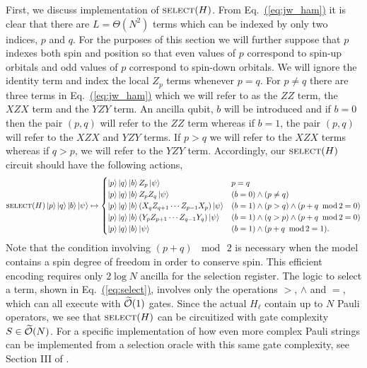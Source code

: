 \documentclass[superscriptaddress,aps,pra,nofootinbib,notitlepage,10pt,longbibliography]{revtex4-1}
\newcommand{\eq}[1]{Eq.~\hyperref[eq:#1]{(\ref*{eq:#1})}}
\def\ket#1{\mathinner{|{#1}\rangle}}
\begin{document}
First, we discuss implementation of $\textsc{select}(H)$. From \eq{jw_ham} it is clear that there are $L = \Theta(N^2)$ terms which can be indexed by only two indices, $p$ and $q$. For the purposes of this section we will further suppose that $p$ indexes both spin and position so that even values of $p$ correspond to spin-up orbitals and odd values of $p$ correspond to spin-down orbitals. We will ignore the identity term and index the local $Z_p$ terms whenever $p = q$. For $p \neq q$ there are three terms in \eq{jw_ham} which we will refer to as the $ZZ$ term, the $XZX$ term and the $YZY$ term. An ancilla qubit, $b$ will be introduced and if $b = 0$ then the pair $(p, q)$ will refer to the $ZZ$ term whereas if $b = 1$, the pair $(p, q)$ will refer to the $XZX$ and $YZY$ terms. If $p > q$ we will refer to the $XZX$ terms whereas if $q > p$, we will refer to the $YZY$ term. Accordingly, our $\textsc{select}(H)$ circuit should have the following actions,
\begin{equation}
\label{eq:select}
\textsc{select}(H) \ket{p} \ket{q} \ket{b} \ket{\psi} \mapsto \begin{cases}
\ket{p} \ket{q} \ket{b} Z_p \ket{\psi} & p = q \\
\ket{p} \ket{q} \ket{b} Z_p Z_q \ket{\psi} & (b = 0) \wedge (p \neq q) \\
\ket{p} \ket{q} \ket{b} (X_q Z_{q + 1} \cdots Z_{p - 1} X_p) \ket{\psi} & (b = 1) \wedge (p > q) \wedge (p + q \, \!\!\mod\!\! \, 2 = 0 )\\
\ket{p} \ket{q} \ket{b} (Y_p Z_{p + 1} \cdots Z_{q - 1} Y_q) \ket{\psi} & (b = 1) \wedge (q > p) \wedge (p + q \, \!\!\mod\!\! \, 2 = 0)\\
\ket{p} \ket{q} \ket{b} \ket{\psi} & (b = 1) \wedge (p + q \, \!\!\mod\!\! \, 2 = 1).
\end{cases}
\end{equation}
Note that the condition involving $(p + q) \, \!\!\mod\!\! \, 2$ is necessary when the model contains a spin degree of freedom in order to conserve spin. This efficient encoding requires only $2 \log N$ ancilla for the selection register. The logic to select a term, shown in \eq{select}, involves only the operations $>$, $\wedge$ and $=$, which can all execute with $\widetilde{\cal O}(1)$ gates. Since the actual $H_\ell$ contain up to $N$ Pauli operators, we see that $\textsc{select}(H)$ can be circuitized with gate complexity $S \in \widetilde{\cal O}(N)$. For a specific implementation of how even more complex Pauli strings can be implemented from a selection oracle with this same gate complexity, see Section III of \cite{BabbushSparse1}.
\end{document}
